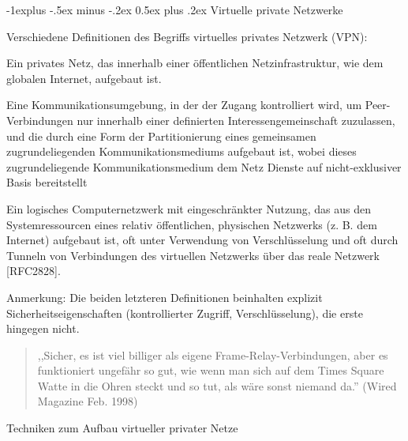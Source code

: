 \documentclass[a4paper]{article}
\makeatletter
\renewcommand{\subsection}{\@startsection{subsection}{2}{0mm}%
 {-1explus -.5ex minus -.2ex}%
 {0.5ex plus .2ex}%
 {\normalfont\normalsize\bfseries}}
\makeatother
\begin{document}
\begin{multicols}{3}
      \subsection{Virtuelle private
            Netzwerke}

      \begin{itemize*}
            \item Verschiedene Definitionen des Begriffs virtuelles privates Netzwerk
            (VPN):
            \begin{itemize*}
                  \item Ein privates Netz, das innerhalb einer öffentlichen Netzinfrastruktur, wie dem globalen Internet, aufgebaut ist.
                  \item Eine Kommunikationsumgebung, in der der Zugang kontrolliert wird, um Peer-Verbindungen nur innerhalb einer definierten Interessengemeinschaft zuzulassen, und die durch eine Form der Partitionierung eines gemeinsamen zugrundeliegenden Kommunikationsmediums aufgebaut ist, wobei dieses zugrundeliegende Kommunikationsmedium dem Netz Dienste auf nicht-exklusiver Basis bereitstellt
                  \item Ein logisches Computernetzwerk mit eingeschränkter Nutzung, das aus den Systemressourcen eines relativ öffentlichen, physischen Netzwerks (z. B. dem Internet) aufgebaut ist, oft unter Verwendung von Verschlüsselung und oft durch Tunneln von Verbindungen des virtuellen Netzwerks über das reale Netzwerk {[}RFC2828{]}.
                  \item Anmerkung: Die beiden letzteren Definitionen beinhalten explizit Sicherheitseigenschaften (kontrollierter Zugriff, Verschlüsselung), die erste hingegen nicht.
            \end{itemize*}
      \end{itemize*}

      \begin{quote}
            ,,Sicher, es ist viel billiger als eigene Frame-Relay-Verbindungen, aber
            es funktioniert ungefähr so gut, wie wenn man sich auf dem Times Square
            Watte in die Ohren steckt und so tut, als wäre sonst niemand da.''
            (Wired Magazine Feb. 1998)
      \end{quote}

      Techniken zum Aufbau virtueller privater Netze


\end{multicols}
\end{document}
